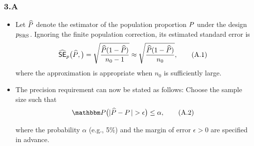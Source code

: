 \documentclass{my_eth_beamer}
\numberwithin{equation}{section}
\newcommand{\NR}{3}
\begin{document}
\begin{frame}
    \frametitle{\NR.\insertsubsectionnumber A~\insertsubsubsection}
     \begin{itemize}
     \setlength{\itemsep}{3pt}
        \item Let $\widehat{P}$ denote the estimator of the population proportion
            $P$ under the design $p_{\mathrm{SRS}}$. Ignoring the finite
             population correction, its estimated standard error is
            \begin{equation*}
                \widehat{\mathsf{SE}}_p\big(\widehat{P},\big) =
                \sqrt{\frac{\widehat{P}(1-\widehat{P})}{n_0-1}}
                \approx
                \sqrt{\frac{\widehat{P}(1-\widehat{P})}{n_0}}, \tag{A.1}
            \end{equation*}
            where the approximation is appropriate when $n_0$ is sufficiently
             large.

        \item The precision requirement can now be stated as follows:
            \alert{Choose the sample size such that}
            \begin{equation*}
                \PP\big(\vert \props - \propu \, \vert > \epsilon \big) \leq
                \alpha, \tag{A.2}
            \end{equation*}

            \vspace{-0.25em}

            \noindent where the probability $\alpha$ (e.g., 5\%) and the
             \alert{margin of error} $\epsilon > 0$ are specified in advance.
     \end{itemize}
\end{frame}
\end{document}
